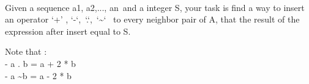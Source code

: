  

Given a sequence a1, a2,..., an and a integer S, your task is find a way to insert an operator ‘+’ , ‘-‘, ‘.‘, ‘\textasciitilde‘  to every neighbor pair of A, that the result of the expression after insert equal to S.

Note that :
\\- a . b = a + 2 * b
\\- a \textasciitilde b = a - 2 * b

 
